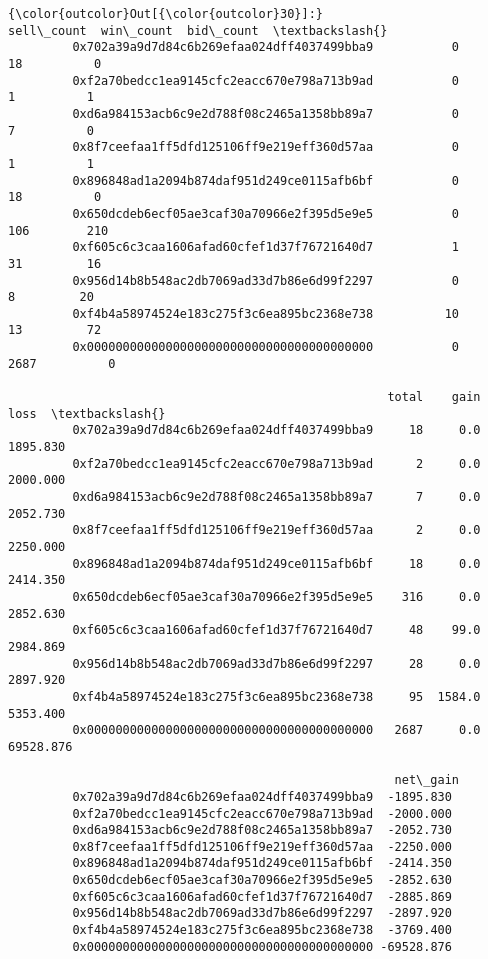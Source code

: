 \documentclass[11pt]{article}
\begin{document}
\begin{Verbatim}[commandchars=\\\{\}]
{\color{outcolor}Out[{\color{outcolor}30}]:}                                             sell\_count  win\_count  bid\_count  \textbackslash{}
         0x702a39a9d7d84c6b269efaa024dff4037499bba9           0         18          0   
         0xf2a70bedcc1ea9145cfc2eacc670e798a713b9ad           0          1          1   
         0xd6a984153acb6c9e2d788f08c2465a1358bb89a7           0          7          0   
         0x8f7ceefaa1ff5dfd125106ff9e219eff360d57aa           0          1          1   
         0x896848ad1a2094b874daf951d249ce0115afb6bf           0         18          0   
         0x650dcdeb6ecf05ae3caf30a70966e2f395d5e9e5           0        106        210   
         0xf605c6c3caa1606afad60cfef1d37f76721640d7           1         31         16   
         0x956d14b8b548ac2db7069ad33d7b86e6d99f2297           0          8         20   
         0xf4b4a58974524e183c275f3c6ea895bc2368e738          10         13         72   
         0x0000000000000000000000000000000000000000           0       2687          0   
         
                                                     total    gain       loss  \textbackslash{}
         0x702a39a9d7d84c6b269efaa024dff4037499bba9     18     0.0   1895.830   
         0xf2a70bedcc1ea9145cfc2eacc670e798a713b9ad      2     0.0   2000.000   
         0xd6a984153acb6c9e2d788f08c2465a1358bb89a7      7     0.0   2052.730   
         0x8f7ceefaa1ff5dfd125106ff9e219eff360d57aa      2     0.0   2250.000   
         0x896848ad1a2094b874daf951d249ce0115afb6bf     18     0.0   2414.350   
         0x650dcdeb6ecf05ae3caf30a70966e2f395d5e9e5    316     0.0   2852.630   
         0xf605c6c3caa1606afad60cfef1d37f76721640d7     48    99.0   2984.869   
         0x956d14b8b548ac2db7069ad33d7b86e6d99f2297     28     0.0   2897.920   
         0xf4b4a58974524e183c275f3c6ea895bc2368e738     95  1584.0   5353.400   
         0x0000000000000000000000000000000000000000   2687     0.0  69528.876   
         
                                                      net\_gain  
         0x702a39a9d7d84c6b269efaa024dff4037499bba9  -1895.830  
         0xf2a70bedcc1ea9145cfc2eacc670e798a713b9ad  -2000.000  
         0xd6a984153acb6c9e2d788f08c2465a1358bb89a7  -2052.730  
         0x8f7ceefaa1ff5dfd125106ff9e219eff360d57aa  -2250.000  
         0x896848ad1a2094b874daf951d249ce0115afb6bf  -2414.350  
         0x650dcdeb6ecf05ae3caf30a70966e2f395d5e9e5  -2852.630  
         0xf605c6c3caa1606afad60cfef1d37f76721640d7  -2885.869  
         0x956d14b8b548ac2db7069ad33d7b86e6d99f2297  -2897.920  
         0xf4b4a58974524e183c275f3c6ea895bc2368e738  -3769.400  
         0x0000000000000000000000000000000000000000 -69528.876  
\end{Verbatim}
            
\end{document}

